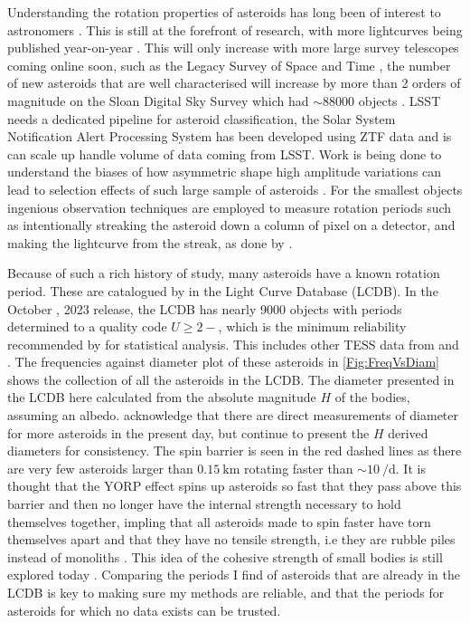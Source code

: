 \documentclass{UCreport}
\begin{document}
Understanding the rotation properties of asteroids has long been of interest to astronomers \citep[e.g.][for early work into the limits of rotation period and the tumbling nature of some small bodies]{Weidenschilling1981,Harris1994}.
This is still at the forefront of research, with more lightcurves being published year-on-year \citep{Harris2015}.
This will only increase with more large survey telescopes coming online soon, such as the Legacy Survey of Space and Time \citep[LSST][]{LSST2019}, the number of new asteroids that are well characterised will increase by more than 2 orders of magnitude on the Sloan Digital Sky Survey \citep[SDSS][]{York2000} which had $\sim 88000$ objects \citet{Parker2008}.
LSST needs a dedicated pipeline for asteroid classification, the Solar System Notification Alert Processing System \citep[SNAPS][]{Trilling2023} has been developed using ZTF data and is can scale up handle volume of data coming from LSST.
Work is being done to understand the biases of how  asymmetric shape high amplitude variations can lead to selection effects of such large sample of asteroids \citet{Levine2023}.
For the smallest objects ingenious observation techniques are employed to measure rotation periods such as intentionally streaking the asteroid down a column of pixel on a detector, and making the lightcurve from the streak, as done by \citet{Bolin2023}.

Because of such a rich history of study, many asteroids have a known rotation period.
These are catalogued by \citet{Warner2009} %
in the Light Curve Database (LCDB).
In the October , 2023 release, the LCDB has nearly 9000 objects with periods determined to a quality code $U\geq 2-$, which is the minimum reliability recommended by \citeauthor{Warner2009} for statistical analysis.
This includes other TESS data from \citet{Pal2020} and \citet{Woods2021}.
The frequencies against diameter plot of these asteroids in \autoref{Fig:FreqVsDiam} shows the collection of all the asteroids in the LCDB.
The diameter presented in the LCDB here calculated from the absolute magnitude $H$ of the bodies, assuming an albedo.
\citeauthor{Warner2009} acknowledge that there are direct measurements of diameter for more asteroids in the present day, but continue to present the $H$ derived diameters for consistency.
The spin barrier \citep{Pravec2000} is seen in the red dashed lines as there are very few asteroids larger than $\qty{0.15}{\kilo\metre}$ rotating faster than $\sim \qty{10}{\per\day}$.
It is thought that the YORP effect spins up asteroids so fast that they pass above this barrier and then no longer have the internal strength necessary to hold themselves together, impling that all asteroids made to spin faster have torn themselves apart and that they have no tensile strength, i.e they are rubble piles instead of monoliths \citep{Harris1996}. This idea of the cohesive strength of small bodies is still explored today \citep[e.g.][for V-type asteroids]{Oszkiewicz2020}.
Comparing the periods I find of asteroids that are already in the LCDB is key to making sure my methods are reliable, and that the periods for asteroids for which no data exists can be trusted.
\end{document}
